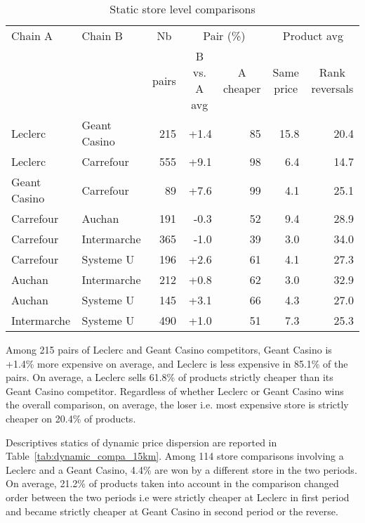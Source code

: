 \documentclass[english]{article}
\begin{document}
\begin{table}
\caption{Static store level comparisons}
\label{tab:static_compa_15km}
\begin{threeparttable}
\begin{tabular}{llr|rr|rr}
\toprule
\toprule
    Chain A & Chain B & \multicolumn{1}{c|}{Nb} & \multicolumn{2}{c|}{Pair  (\%)} & \multicolumn{2}{c}{Product avg} \\
          &       & \multicolumn{1}{c|}{pairs} & \multicolumn{1}{c}{B vs. A avg} & \multicolumn{1}{c|}{A cheaper } & \multicolumn{1}{c}{Same price} & \multicolumn{1}{c}{Rank reversals} \\
    \midrule
    Leclerc & Geant Casino & 215   & +1.4  & 85    & 15.8  & 20.4 \\
    Leclerc & Carrefour & 555   & +9.1  & 98    & 6.4   & 14.7 \\
    Geant Casino & Carrefour & 89    & +7.6  & 99    & 4.1   & 25.1 \\
    Carrefour & Auchan & 191   & -0.3  & 52    & 9.4   & 28.9 \\
    Carrefour & Intermarche & 365   & -1.0  & 39    & 3.0   & 34.0 \\
    Carrefour & Systeme U & 196   & +2.6  & 61    & 4.1   & 27.3 \\
    Auchan & Intermarche & 212   & +0.8  & 62    & 3.0   & 32.9 \\
    Auchan & Systeme U & 145   & +3.1  & 66    & 4.3   & 27.0 \\
    Intermarche & Systeme U & 490   & +1.0  & 51    & 7.3   & 25.3 \\
    \bottomrule
    \bottomrule
\end{tabular}
\begin{tablenotes}
      \small
      \item Among 215 pairs of Leclerc and Geant Casino competitors, Geant Casino is +1.4\% more expensive on average, and Leclerc is less expensive in 85.1\% of the pairs. On average, a Leclerc sells 61.8\% of products strictly cheaper than its Geant Casino competitor. Regardless of whether Leclerc or Geant Casino wins the overall comparison, on average, the loser i.e. most expensive store is strictly cheaper on 20.4\% of products.
\end{tablenotes}
\end{threeparttable}
\end{table}

Descriptives statics of dynamic price dispersion are reported in Table~\ref{tab:dynamic_compa_15km}. Among 114 store comparisons involving a Leclerc and a Geant Casino, 4.4\% are won by a different store in the two periods. On average, 21.2\% of products taken into account in the comparison changed order between the two periods i.e were strictly cheaper at Leclerc in first period and became strictly cheaper at Geant Casino in second period or the reverse.
\end{document}
